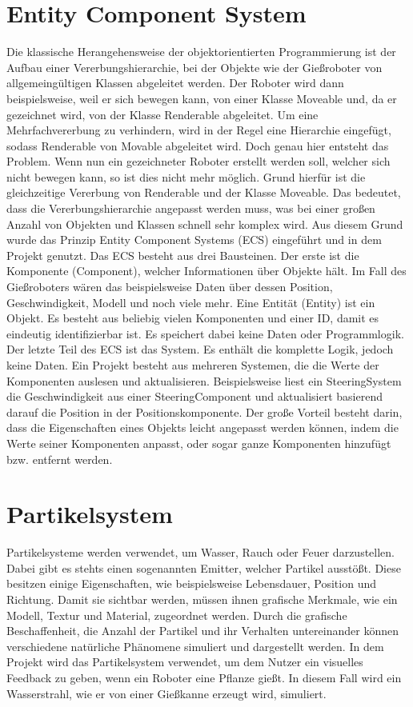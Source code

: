 \section{Entity Component System}
Die klassische Herangehensweise der objektorientierten Programmierung ist der Aufbau einer Vererbungshierarchie, bei der Objekte wie der Gießroboter von allgemeingültigen Klassen abgeleitet werden. Der Roboter wird dann beispielsweise, weil er sich bewegen kann, von einer Klasse Moveable und, da er gezeichnet wird, von der Klasse Renderable abgeleitet. Um eine Mehrfachvererbung zu verhindern, wird in der Regel eine Hierarchie eingefügt, sodass Renderable von Movable abgeleitet wird. Doch genau hier entsteht das Problem. Wenn nun ein gezeichneter Roboter erstellt werden soll, welcher sich nicht bewegen kann, so ist dies nicht mehr möglich. Grund hierfür ist die gleichzeitige Vererbung von Renderable und der Klasse Moveable. Das bedeutet, dass die Vererbungshierarchie angepasst werden muss, was bei einer großen Anzahl von Objekten und Klassen schnell sehr komplex wird. Aus diesem Grund wurde das Prinzip Entity Component Systems (ECS) eingeführt und in dem Projekt genutzt.
Das ECS besteht aus drei Bausteinen. Der erste ist die Komponente (Component), welcher Informationen über Objekte hält. Im Fall des Gießroboters wären das beispielsweise Daten über dessen Position, Geschwindigkeit, Modell und noch viele mehr. Eine Entität (Entity) ist ein Objekt. Es besteht aus beliebig vielen Komponenten und einer ID, damit es eindeutig identifizierbar ist. Es speichert dabei keine Daten oder Programmlogik. Der letzte Teil des ECS ist das System. Es enthält die komplette Logik, jedoch keine Daten. Ein Projekt besteht aus mehreren Systemen, die die Werte der Komponenten auslesen und aktualisieren.
Beispielsweise liest ein SteeringSystem die Geschwindigkeit aus einer SteeringComponent und aktualisiert basierend darauf die Position in der Positionskomponente. Der große Vorteil besteht darin, dass die Eigenschaften eines Objekts leicht angepasst werden können, indem die Werte seiner Komponenten anpasst, oder sogar ganze Komponenten hinzufügt bzw. entfernt werden.
\section{Partikelsystem}
Partikelsysteme werden verwendet, um Wasser, Rauch oder Feuer darzustellen. Dabei gibt es stehts einen sogenannten Emitter, welcher Partikel ausstößt. Diese besitzen einige Eigenschaften, wie beispielsweise Lebensdauer, Position und Richtung. Damit sie sichtbar werden, müssen ihnen grafische Merkmale, wie ein Modell, Textur und Material, zugeordnet werden. Durch die grafische Beschaffenheit, die Anzahl der Partikel und ihr Verhalten untereinander können verschiedene natürliche Phänomene simuliert und dargestellt werden. In dem Projekt wird das Partikelsystem verwendet, um dem Nutzer ein visuelles Feedback zu geben, wenn ein Roboter eine Pflanze gießt. In diesem Fall wird ein Wasserstrahl, wie er von einer Gießkanne erzeugt wird, simuliert.

